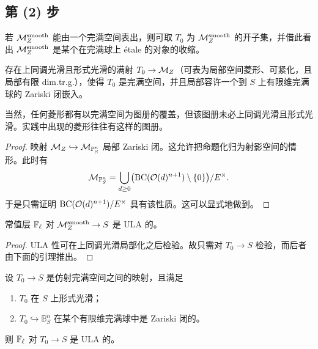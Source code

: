 \subsection{第 (2) 步}

若 $\mathcal{M}_Z^{\mathrm{smooth}}$ 能由一个完满空间表出，则可取 $T_0$ 为 $\mathcal{M}_Z^{\mathrm{smooth}}$ 的开子集，并借此看出 $\mathcal{M}_Z^{\mathrm{smooth}}$ 是某个在完满球上 étale 的对象的收缩。

\begin{proposition}
存在上同调光滑且形式光滑的满射 $T_0\to\mathcal{M}_Z$（可表为局部空间菱形、可紧化，且局部有限 dim.tr.g.），使得 $T_0$ 是完满空间，并且局部容许一个到 $S$ 上有限维完满球的 Zariski 闭嵌入。
\end{proposition}

\begin{remark}
当然，任何菱形都有以完满空间为图册的覆盖，但该图册未必上同调光滑且形式光滑。实践中出现的菱形往往有这样的图册。
\end{remark}


\begin{proof}
映射 $\mathcal{M}_Z\hookrightarrow\mathcal{M}_{\mathbb{P}^n_S}$ 局部 Zariski 闭。这允许把命题化归为射影空间的情形。此时有
\[
\mathcal{M}_{\mathbb{P}^n_S}=\bigcup_{d\ge0}\bigl(\mathrm{BC}(\mathcal{O}(d)^{n+1})\setminus\{0\}\bigr)/E^\times.
\]
于是只需证明 $\mathrm{BC}(\mathcal{O}(d)^{n+1})/E^\times$ 具有该性质。这可以显式地做到。
\end{proof}

\begin{corollary}
常值层 $\mathbb{F}_\ell$ 对 $\mathcal{M}_Z^{\mathrm{smooth}}\to S$ 是 ULA 的。
\end{corollary}

\begin{proof}
ULA 性可在上同调光滑局部化之后检验。故只需对 $T_0\to S$ 检验，而后者由下面的引理推出。
\end{proof}

\begin{lemma}
设 $T_0\to S$ 是仿射完满空间之间的映射，且满足
\begin{enumerate}[label=(\arabic*)]
\item $T_0$ 在 $S$ 上形式光滑；
\item $T_0\hookrightarrow\mathbb{B}^n_S$ 在某个有限维完满球中是 Zariski 闭的。
\end{enumerate}
则 $\mathbb{F}_\ell$ 对 $T_0\to S$ 是 ULA 的。
\end{lemma}

